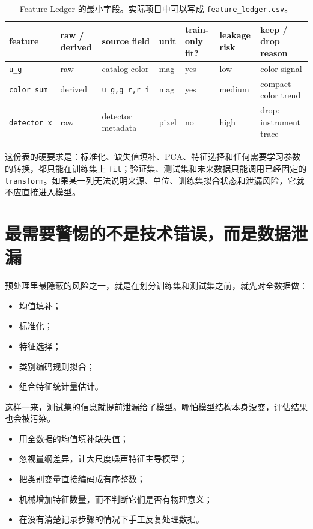 \begin{table}[htbp]
\centering
\small
\setlength{\tabcolsep}{3pt}
\begin{tabular}{p{}p{}p{}p{}p{}p{}p{}}
\toprule
feature & raw / derived & source field & unit & train-only fit? & leakage risk & keep / drop reason \\
\midrule
\texttt{u\_g} & raw & catalog color & mag & yes & low & color signal \\
\texttt{color\_sum} & derived & \texttt{u\_g,g\_r,r\_i} & mag & yes & medium & compact color trend \\
\texttt{detector\_x} & raw & detector metadata & pixel & no & high & drop: instrument trace \\
\bottomrule
\end{tabular}
\normalsize
\caption{Feature Ledger 的最小字段。实际项目中可以写成 \texttt{feature\_ledger.csv}。}
\label{tab:ch21_feature_ledger}
\end{table}

这份表的硬要求是：标准化、缺失值填补、PCA、特征选择和任何需要学习参数的转换，都只能在训练集上 \texttt{fit}；验证集、测试集和未来数据只能调用已经固定的 \texttt{transform}。如果某一列无法说明来源、单位、训练集拟合状态和泄漏风险，它就不应直接进入模型。

\section{最需要警惕的不是技术错误，而是数据泄漏}

预处理里最隐蔽的风险之一，就是在划分训练集和测试集之前，就先对全数据做：

\begin{itemize}
    \item 均值填补；
    \item 标准化；
    \item 特征选择；
    \item 类别编码规则拟合；
    \item 组合特征统计量估计。
\end{itemize}

这样一来，测试集的信息就提前泄漏给了模型。哪怕模型结构本身没变，评估结果也会被污染。

\begin{warnbox}[预处理中最常见的误区]
\begin{itemize}
    \item 用全数据的均值填补缺失值；
    \item 忽视量纲差异，让大尺度噪声特征主导模型；
    \item 把类别变量直接编码成有序整数；
    \item 机械增加特征数量，而不判断它们是否有物理意义；
    \item 在没有清楚记录步骤的情况下手工反复处理数据。
\end{itemize}
\end{warnbox}

